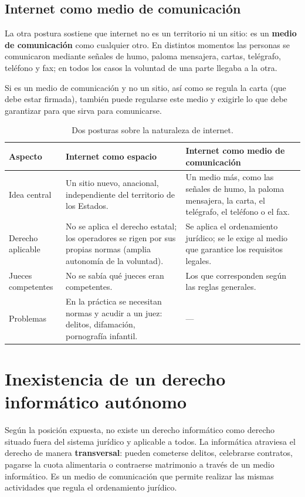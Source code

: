 \documentclass[12pt,oneside]{book}
\begin{document}
\subsection{Internet como medio de comunicación}

La otra postura sostiene que internet no es un territorio ni un sitio: es un \textbf{medio de comunicación} como cualquier otro. En distintos momentos las personas se comunicaron mediante señales de humo, paloma mensajera, cartas, telégrafo, teléfono y fax; en todos los casos la voluntad de una parte llegaba a la otra.

Si es un medio de comunicación y no un sitio, así como se regula la carta (que debe estar firmada), también puede regularse este medio y exigirle lo que debe garantizar para que sirva para comunicarse.

\begin{table}[H]
\centering
\small
\caption{Dos posturas sobre la naturaleza de internet.}
\begin{tabularx}{\textwidth}{>{\raggedright\arraybackslash}p{} Y Y}
\toprule
\textbf{Aspecto} & \textbf{Internet como espacio} & \textbf{Internet como medio de comunicación} \\
\midrule
Idea central & Un sitio nuevo, anacional, independiente del territorio de los Estados. & Un medio más, como las señales de humo, la paloma mensajera, la carta, el telégrafo, el teléfono o el fax. \\
Derecho aplicable & No se aplica el derecho estatal; los operadores se rigen por sus propias normas (amplia autonomía de la voluntad). & Se aplica el ordenamiento jurídico; se le exige al medio que garantice los requisitos legales. \\
Jueces competentes & No se sabía qué jueces eran competentes. & Los que corresponden según las reglas generales. \\
Problemas & En la práctica se necesitan normas y acudir a un juez: delitos, difamación, pornografía infantil. & --- \\
\bottomrule
\end{tabularx}
\end{table}

\section{Inexistencia de un derecho informático autónomo}

Según la posición expuesta, no existe un derecho informático como derecho situado fuera del sistema jurídico y aplicable a todos. La informática atraviesa el derecho de manera \textbf{transversal}: pueden cometerse delitos, celebrarse contratos, pagarse la cuota alimentaria o contraerse matrimonio a través de un medio informático. Es un medio de comunicación que permite realizar las mismas actividades que regula el ordenamiento jurídico.
\end{document}
